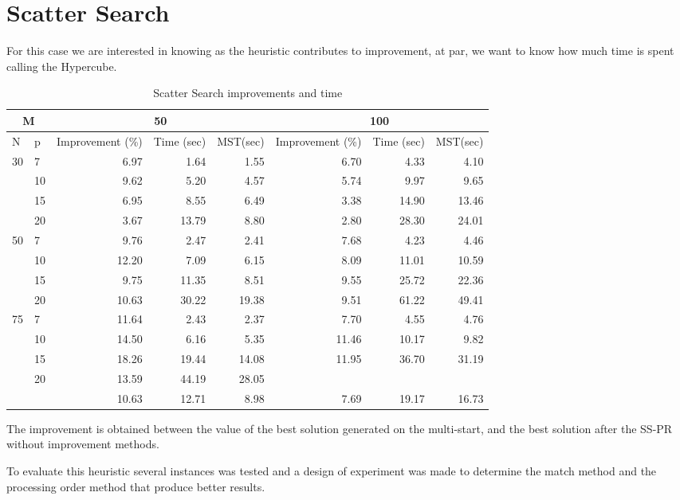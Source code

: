 \section{Scatter Search}
For this case
we are interested in knowing
as the heuristic contributes to improvement,
at par,
we want to know
how much time is spent
calling the Hypercube.

\begin{table}[h]
  \begin{tabular}{|l|l|r|r|r|r|r|r|}
    \hline
    \multicolumn{2}{|c|}{M}
    & \multicolumn{3}{|c|}{50}
    & \multicolumn{3}{|c|}{100} \\ \hline 
    N & p & Improvement (\%) & Time (sec) & MST(sec)
    & Improvement (\%) & Time (sec) & MST(sec) \\ \hline
    \multirow{4}{*}{30}
    & 7 & 6.97 & 1.64 & 1.55
    & 6.70 & 4.33 & 4.10 \\
    & 10 & 9.62 & 5.20 & 4.57
    & 5.74 & 9.97 & 9.65 \\
    & 15 & 6.95 & 8.55 & 6.49
    & 3.38 & 14.90 & 13.46 \\
    & 20 & 3.67 & 13.79 & 8.80
    & 2.80 & 28.30 & 24.01 \\ \hline
    \multirow{4}{*}{50}
    & 7 & 9.76 & 2.47 & 2.41
    & 7.68 & 4.23 & 4.46 \\
    & 10 & 12.20 & 7.09 & 6.15
    & 8.09 & 11.01 & 10.59 \\
    & 15 & 9.75 & 11.35 & 8.51
    & 9.55 & 25.72 & 22.36 \\
    & 20 & 10.63 & 30.22 & 19.38
    & 9.51 & 61.22 & 49.41 \\ \hline
    \multirow{4}{*}{75}
    & 7 & 11.64 & 2.43 & 2.37
    & 7.70 & 4.55 & 4.76 \\
    & 10 & 14.50 & 6.16 & 5.35
    & 11.46 & 10.17 & 9.82 \\
    & 15 & 18.26 & 19.44 & 14.08
    & 11.95 & 36.70 & 31.19 \\
    & 20 & 13.59 & 44.19 & 28.05
    & & & \\ \hline
    & & 10.63 & 12.71 & 8.98
    & 7.69 & 19.17 & 16.73 \\
    \hline
  \end{tabular}
  \caption[Scatter Search]{Scatter Search improvements and time}
  \label{tab:SS}
\end{table}
The improvement
is obtained
between the value of the best solution
generated on the multi-start,
and the best solution after the SS-PR
without improvement methods.

To evaluate this heuristic
several instances was tested
and
a design of experiment was made
to determine
the match method
and the processing order method
that produce better results.

